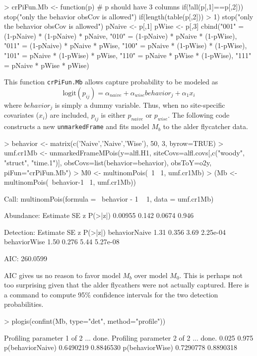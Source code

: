 \documentclass[a4paper]{article}
\renewenvironment{Schunk}{\vspace{\topsep}}{\vspace{\topsep}}
\begin{document}
\begin{Schunk}
\begin{Sinput}
> crPiFun.Mb <- function(p) { # p should have 3 columns
     if(!all(p[,1]==p[,2]))
         stop("only the behavior obsCov is allowed")
     if(length(table(p[,2])) > 1)
         stop("only the behavior obsCov is allowed")
     pNaive <- p[,1]
     pWise <- p[,3]
     cbind("001" = (1-pNaive) * (1-pNaive) * pNaive,
           "010" = (1-pNaive) * pNaive     * (1-pWise),
           "011" = (1-pNaive) * pNaive     * pWise,
           "100" = pNaive     * (1-pWise)  * (1-pWise),
           "101" = pNaive     * (1-pWise)  * pWise,
           "110" = pNaive     * pWise      * (1-pWise),
           "111" = pNaive     * pWise      * pWise)
 }
\end{Sinput}
\end{Schunk}
This function \texttt{crPiFun.Mb} allows capture probability to be
modeled as
\[
\text{logit}(p_{ij}) = \alpha_{naive} + \alpha_{wise} behavior_j + \alpha_1 x_i
\]
where $behavior_j$ is simply a dummy variable. Thus, when no
site-specific covariates ($x_i$) are included, $p_{ij}$ is either $p_{naive}$
or $p_{wise}$. The following code constructs a new
\texttt{unmarkedFrame} and fits model $M_b$ to the alder
flycatcher data.

\begin{Schunk}
\begin{Sinput}
> behavior <- matrix(c('Naive','Naive','Wise'), 50, 3, byrow=TRUE)
> umf.cr1Mb <- unmarkedFrameMPois(y=alfl.H1,
     siteCovs=alfl.covs[,c("woody", "struct", "time.1")],
     obsCovs=list(behavior=behavior),
     obsToY=o2y, piFun="crPiFun.Mb")
> M0 <- multinomPois(~1 ~1, umf.cr1Mb)
> (Mb <- multinomPois(~behavior-1 ~1, umf.cr1Mb))
\end{Sinput}
\begin{Soutput}
Call:
multinomPois(formula = ~behavior - 1 ~ 1, data = umf.cr1Mb)

Abundance:
 Estimate    SE      z P(>|z|)
  0.00955 0.142 0.0674   0.946

Detection:
              Estimate    SE    z  P(>|z|)
behaviorNaive     1.31 0.356 3.69 2.25e-04
behaviorWise      1.50 0.276 5.44 5.27e-08

AIC: 260.0599 
\end{Soutput}
\end{Schunk}
AIC gives us no reason to favor model $M_b$ over model $M_0$. This is
perhaps not too surprising given that the alder
flycathers were not actually captured. Here is a command to compute
95\% confidence intervals for the two detection probabilities.
\begin{Schunk}
\begin{Sinput}
> plogis(confint(Mb, type="det", method="profile"))
\end{Sinput}
\begin{Soutput}
Profiling parameter 1 of 2 ... done.
Profiling parameter 2 of 2 ... done.
                     0.025     0.975
p(behaviorNaive) 0.6490219 0.8846530
p(behaviorWise)  0.7290778 0.8890318
\end{Soutput}
\end{Schunk}
\end{document}

